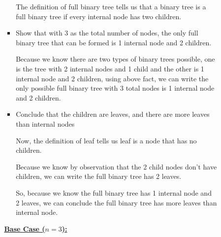 \documentclass[12pt]{article}
\begin{document}
\begin{itemize}
\begin{mdframed}
\begin{enumerate}[1.]
\begin{enumerate}[1.]
\begin{itemize}
                    \begin{mdframed}
                    The definition of full binary tree tells us that a binary tree is a full
                    binary tree if every internal node has two children.
                    \end{mdframed}

                    \item Show that with 3 as the total number of nodes, the only full binary
                    tree that can be formed is 1 internal node and 2 children.

                    \begin{mdframed}
                    Because we know there are two types of binary trees possible,
                    one is the tree with 2 internal nodes and 1 child and the other
                    is 1 internal node and 2 children, using above fact, we can write
                    the only possible full binary tree with 3 total nodes is 1 internal
                    node and 2 children.
                    \end{mdframed}

                    \item Conclude that the children are leaves, and there are more
                    leaves than internal nodes

                    \begin{mdframed}
                    Now, the definition of leaf tells us leaf is a node that has no children.

                    \bigskip

                    Because we know by observation that the 2 child nodes don't
                    have children, we can write the full binary tree has 2 leaves.

                    \bigskip

                    So, because we know the full binary tree has 1 internal node
                    and 2 leaves, we can conclude the full binary tree has more
                    leaves than internal node.
                    \end{mdframed}
                \end{itemize}

                \bigskip

                \begin{mdframed}

                \underline{\textbf{Base Case ($n = 3$):}}


\end{mdframed}
\end{enumerate}
\end{enumerate}
\end{mdframed}
\end{itemize}
\end{document}
